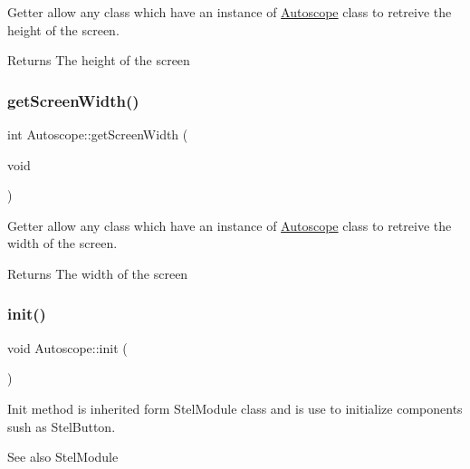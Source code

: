 Getter allow any class which have an instance of \mbox{\hyperlink{class_autoscope}{Autoscope}} class to retreive the height of the screen. 

\begin{DoxyReturn}{Returns}
The height of the screen 
\end{DoxyReturn}
\mbox{\label{class_autoscope_a0e438a40043c916a7f0f98a30221de11}} 
\subsubsection{\texorpdfstring{getScreenWidth()}{getScreenWidth()}}
{\footnotesize\ttfamily int Autoscope\+::get\+Screen\+Width (\begin{DoxyParamCaption}\item[{void}]{ }\end{DoxyParamCaption})\hspace{0.3cm}{\ttfamily [inline]}}



Getter allow any class which have an instance of \mbox{\hyperlink{class_autoscope}{Autoscope}} class to retreive the width of the screen. 

\begin{DoxyReturn}{Returns}
The width of the screen 
\end{DoxyReturn}
\mbox{\label{class_autoscope_a0aaa7e7edbdd749e209dc42ee360f3a5}} 
\subsubsection{\texorpdfstring{init()}{init()}}
{\footnotesize\ttfamily void Autoscope\+::init (\begin{DoxyParamCaption}{ }\end{DoxyParamCaption})\hspace{0.3cm}{\ttfamily [virtual]}}



Init method is inherited form Stel\+Module class and is use to initialize components sush as Stel\+Button. 

\begin{DoxySeeAlso}{See also}
Stel\+Module 
\end{DoxySeeAlso}
\mbox{\label{class_autoscope_af24c123f39ace0191799b5c20ceca7a6}} 
